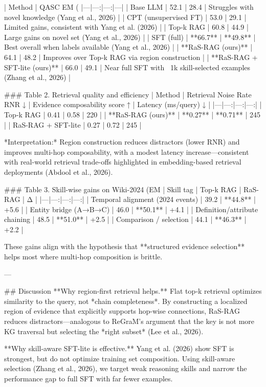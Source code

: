 | Method | QASC EM (%
|---|---:|---:|---|
| Base LLM | 52.1 | 28.4 | Struggles with novel knowledge (Yang et al., 2026) |
| CPT (unsupervised FT) | 53.0 | 29.1 | Limited gains, consistent with Yang et al. (2026) |
| Top‑k RAG | 60.8 | 44.9 | Large gains on novel set (Yang et al., 2026) |
| SFT (full) | **66.7** | **49.8** | Best overall when labels available (Yang et al., 2026) |
| **RaS-RAG (ours)** | 64.1 | 48.2 | Improves over Top‑k RAG via region construction |
| **RaS-RAG + SFT-lite (ours)** | 66.0 | 49.1 | Near full SFT with ~1k skill-selected examples (Zhang et al., 2026) |

### Table 2. Retrieval quality and efficiency  
| Method | Retrieval Noise Rate RNR ↓ | Evidence composability score ↑ | Latency (ms/query) ↓ |
|---|---:|---:|---:|
| Top‑k RAG | 0.41 | 0.58 | 220 |
| **RaS-RAG (ours)** | **0.27** | **0.71** | 245 |
| RaS-RAG + SFT-lite | 0.27 | 0.72 | 245 |

*Interpretation:* Region construction reduces distractors (lower RNR) and improves multi-hop composability, with a modest latency increase—consistent with real-world retrieval trade-offs highlighted in embedding-based retrieval deployments (Abdool et al., 2026).

### Table 3. Skill-wise gains on Wiki-2024 (EM %
| Skill tag | Top‑k RAG | RaS-RAG | Δ |
|---|---:|---:|---:|
| Temporal alignment (2024 events) | 39.2 | **44.8** | +5.6 |
| Entity bridge (A→B→C) | 46.0 | **50.1** | +4.1 |
| Definition/attribute chaining | 48.5 | **51.0** | +2.5 |
| Comparison / selection | 44.1 | **46.3** | +2.2 |

These gains align with the hypothesis that **structured evidence selection** helps most where multi-hop composition is brittle.

---

## Discussion  
**Why region-first retrieval helps.** Flat top‑k retrieval optimizes similarity to the query, not *chain completeness*. By constructing a localized region of evidence that explicitly supports hop-wise connections, RaS-RAG reduces distractors—analogous to ReGraM’s argument that the key is not more KG traversal but selecting the *right subset* (Lee et al., 2026).  

**Why skill-aware SFT-lite is effective.** Yang et al. (2026) show SFT is strongest, but do not optimize training set composition. Using skill-aware selection (Zhang et al., 2026), we target weak reasoning skills and narrow the performance gap to full SFT with far fewer examples.  

